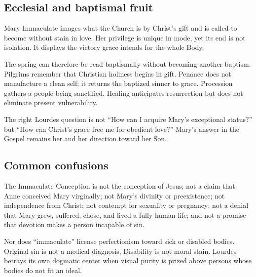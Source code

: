 \subsection{Ecclesial and baptismal fruit}

Mary Immaculate images what the Church is by Christ's gift and is called to become without stain in love. Her privilege is unique in mode, yet its end is not isolation. It displays the victory grace intends for the whole Body.

The spring can therefore be read baptismally without becoming another baptism. Pilgrims remember that Christian holiness begins in gift. Penance does not manufacture a clean self; it returns the baptized sinner to grace. Procession gathers a people being sanctified. Healing anticipates resurrection but does not eliminate present vulnerability.

The right Lourdes question is not “How can I acquire Mary's exceptional status?” but “How can Christ's grace free me for obedient love?” Mary's answer in the Gospel remains her  and her direction toward her Son.

\subsection{Common confusions}

The Immaculate Conception is not the conception of Jesus; not a claim that Anne conceived Mary virginally; not Mary's divinity or preexistence; not independence from Christ; not contempt for sexuality or pregnancy; not a denial that Mary grew, suffered, chose, and lived a fully human life; and not a promise that devotion makes a person incapable of sin.

Nor does “immaculate” license perfectionism toward sick or disabled bodies. Original sin is not a medical diagnosis. Disability is not moral stain. Lourdes betrays its own dogmatic center when visual purity is prized above persons whose bodies do not fit an ideal.
